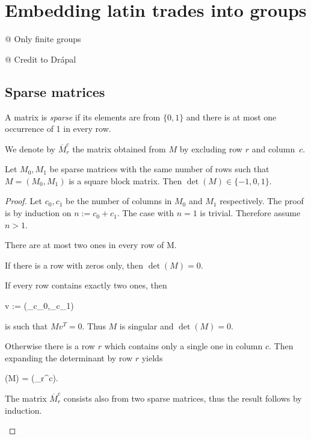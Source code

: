 \chapter{Embedding latin trades into groups}
\label{chap:lower-bound}

@ Only finite groups

@ Credit to Drápal

\section{Sparse matrices}

\begin{defn}
A matrix is \emph{sparse} if its elements are from $\{0,1\}$ and there is at most one occurrence of 1 in every row.
\end{defn}

We denote by $\overbar{M}_r^c$ the matrix obtained from $M$ by excluding row $r$ and column~$c$.

\begin{lem}
\label{lem:sparse2}
Let $M_0,M_1$ be sparse matrices with the same number of rows such that $M = (M_0,M_1)$ is a square block matrix. Then $\det(M) \in \{-1,0,1\}$.
\end{lem}
\begin{proof}
Let $c_0,c_1$ be the number of columns in $M_0$ and $M_1$ respectively. The proof is by induction on $n := c_0+c_1$. The case with $n=1$ is trivial. Therefore assume $n>1$.

There are at most two ones in every row of M.
\begin{cosyitemize}
	\item If there is a row with zeros only, then $\det(M) = 0$.
	\item If every row contains exactly two ones, then
		\begin{cosyeqnarray}
			v := (_{c_0},_{c_1}) \nonumber
		\end{cosyeqnarray}%
		is such that $Mv^T = 0$. Thus $M$ is singular and $\det(M) = 0$.
	\item Otherwise there is a row $r$ which contains only a single one in column $c$. Then expanding the determinant by row $r$ yields
	 \begin{cosyeqnarray}
	 	\det(M) = \pm \det(_r^c).
	 \end{cosyeqnarray}%
	The matrix $\overbar{M}_r^c$ consists also from two sparse matrices, thus the result follows by induction.
\end{cosyitemize}
\end{proof}

